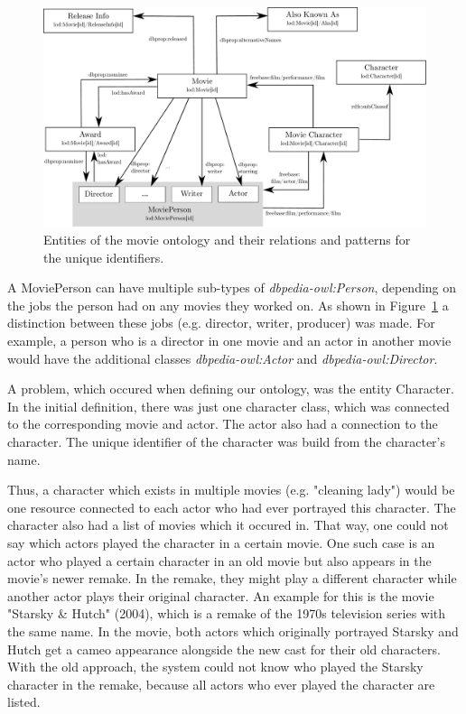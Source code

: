 \begin{figure}[h!]
\includegraphics[width=\textwidth]{images/ontology.pdf}
\caption{Entities of the movie ontology and their relations and patterns for the unique identifiers.}
\label{fig_ontology}
\end{figure}

A MoviePerson can have multiple sub-types of \textit{dbpedia-owl:Person}, depending on the jobs the person had on any movies they worked on.
As shown in Figure~\ref{fig_ontology} a distinction between these jobs (e.g. director, writer, producer) was made.
For example, a person who is a director in one movie and an actor in another movie would have the additional classes \textit{dbpedia-owl:Actor} and \textit{dbpedia-owl:Director}.

A problem, which occured when defining our ontology, was the entity Character.
In the initial definition, there was just one character class, which was connected to the corresponding movie and actor.
The actor also had a connection to the character.
The unique identifier of the character was build from the character's name.

Thus, a character which exists in multiple movies (e.g. "cleaning lady") would be one resource connected to each actor who had ever portrayed this character.
The character also had a list of movies which it occured in.
That way, one could not say which actors played the character in a certain movie.
One such case is an actor who played a certain character in an old movie but also appears in the movie's newer remake.
In the remake, they might play a different character while another actor plays their original character.
An example for this is the movie "Starsky \& Hutch" (2004), which is a remake of the 1970s television series with the same name.
In the movie, both actors which originally portrayed Starsky and Hutch get a cameo appearance alongside the new cast for their old characters.
With the old approach, the system could not know who played the Starsky character in the remake, because all actors who ever played the character are listed.

